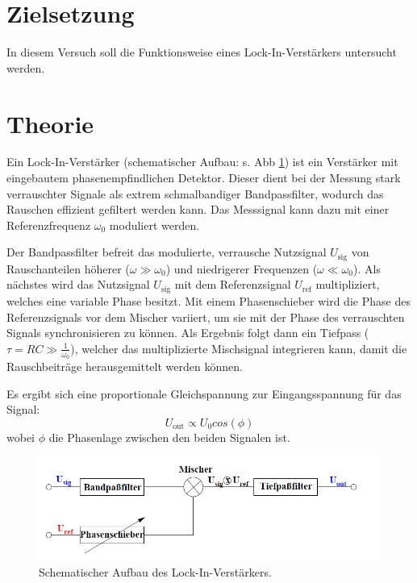 \section{Zielsetzung}
\label{sec:Zielsetzung}
In diesem Versuch soll die Funktionsweise eines Lock-In-Verstärkers untersucht werden.

\section{Theorie}
\label{sec:Theorie}
Ein Lock-In-Verstärker (schematischer Aufbau: s. Abb \ref{fig:aufbau}) ist ein Verstärker mit eingebautem phasenempfindlichen Detektor. Dieser dient bei der Messung stark verrauschter Signale als extrem 
schmalbandiger Bandpassfilter, wodurch das Rauschen effizient gefiltert werden kann. Das Messsignal kann dazu mit einer Referenzfrequenz $\omega_{0}$ moduliert werden.

Der Bandpassfilter befreit das modulierte, verrausche Nutzsignal $U_{\text{sig}}$ von Rauschanteilen höherer ($\omega \gg \omega_{0} $) und niedrigerer Frequenzen ($\omega \ll \omega_{0}$).
Als nächstes wird das Nutzsignal $U_{\text{sig}}$ mit dem Referenzsignal $U_{\text{ref}}$ multipliziert, welches eine variable Phase besitzt.
Mit einem Phasenschieber wird die Phase des Referenzsignals vor dem Mischer variiert, um sie mit der Phase des verrauschten Signals synchronisieren zu können. Als Ergebnis folgt dann ein 
Tiefpass ($\tau = RC \gg \frac{1}{\omega_{0}}$), welcher das multiplizierte Mischsignal integrieren kann, damit die Rauschbeiträge herausgemittelt werden können. 

Es ergibt sich eine proportionale Gleichspannung zur Eingangsspannung für das Signal:
\begin{equation*}
U_{\text{out}} \propto U_{0}cos(\phi)
\end{equation*}
wobei $\phi$ die Phasenlage zwischen den beiden Signalen ist. 

\begin{figure}[h!]
	\centering
	\includegraphics[width=0.8\linewidth]{Aufbau.jpg}
	\caption{Schematischer Aufbau des Lock-In-Verstärkers. \cite[1]{anleitung303}}
	\label{fig:aufbau}
\end{figure}


